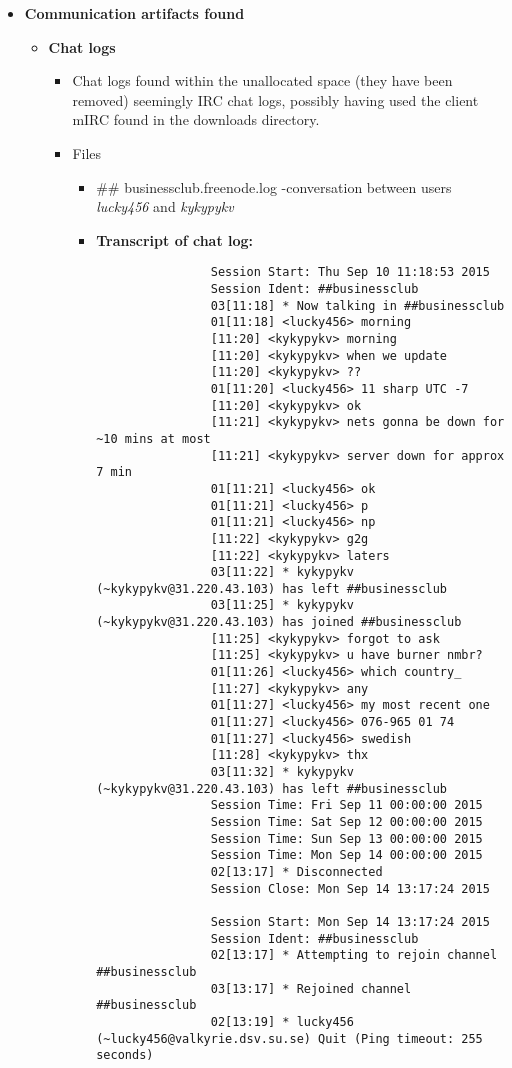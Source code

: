 \begin{enumerate}
\begin{itemize}
\begin{itemize}
\end{itemize}

	\newpage
	\item \textbf{Communication artifacts found}
	
	\begin{itemize}
		\item \textbf{Chat logs}
		 \begin{itemize}
		 	\item Chat logs found within the unallocated space (they have been removed) seemingly IRC chat logs, possibly having used the client mIRC found in the downloads directory.
		 	\item Files
		 	\begin{itemize}
		 		\item \#\# businessclub.freenode.log -conversation between users \textit{lucky456} and  \textit{kykypykv}
		 		
		 		\item \textbf{Transcript of chat log:}
		 		\begin{verbatim} 	
		 		Session Start: Thu Sep 10 11:18:53 2015
		 		Session Ident: ##businessclub
		 		03[11:18] * Now talking in ##businessclub
		 		01[11:18] <lucky456> morning
		 		[11:20] <kykypykv> morning
		 		[11:20] <kykypykv> when we update
		 		[11:20] <kykypykv> ??
		 		01[11:20] <lucky456> 11 sharp UTC -7
		 		[11:20] <kykypykv> ok
		 		[11:21] <kykypykv> nets gonna be down for ~10 mins at most
		 		[11:21] <kykypykv> server down for approx 7 min
		 		01[11:21] <lucky456> ok 
		 		01[11:21] <lucky456> p
		 		01[11:21] <lucky456> np
		 		[11:22] <kykypykv> g2g
		 		[11:22] <kykypykv> laters
		 		03[11:22] * kykypykv (~kykypykv@31.220.43.103) has left ##businessclub
		 		03[11:25] * kykypykv (~kykypykv@31.220.43.103) has joined ##businessclub
		 		[11:25] <kykypykv> forgot to ask
		 		[11:25] <kykypykv> u have burner nmbr?
		 		01[11:26] <lucky456> which country_
		 		[11:27] <kykypykv> any
		 		01[11:27] <lucky456> my most recent one
		 		01[11:27] <lucky456> 076-965 01 74 
		 		01[11:27] <lucky456> swedish
		 		[11:28] <kykypykv> thx
		 		03[11:32] * kykypykv (~kykypykv@31.220.43.103) has left ##businessclub
		 		Session Time: Fri Sep 11 00:00:00 2015
		 		Session Time: Sat Sep 12 00:00:00 2015
		 		Session Time: Sun Sep 13 00:00:00 2015
		 		Session Time: Mon Sep 14 00:00:00 2015
		 		02[13:17] * Disconnected
		 		Session Close: Mon Sep 14 13:17:24 2015
		 		
		 		Session Start: Mon Sep 14 13:17:24 2015
		 		Session Ident: ##businessclub
		 		02[13:17] * Attempting to rejoin channel ##businessclub
		 		03[13:17] * Rejoined channel ##businessclub
		 		02[13:19] * lucky456 (~lucky456@valkyrie.dsv.su.se) Quit (Ping timeout: 255 seconds)
		 		\end{verbatim}
		 		

\end{itemize}
\end{itemize}
\end{itemize}
\end{itemize}
\end{enumerate}
